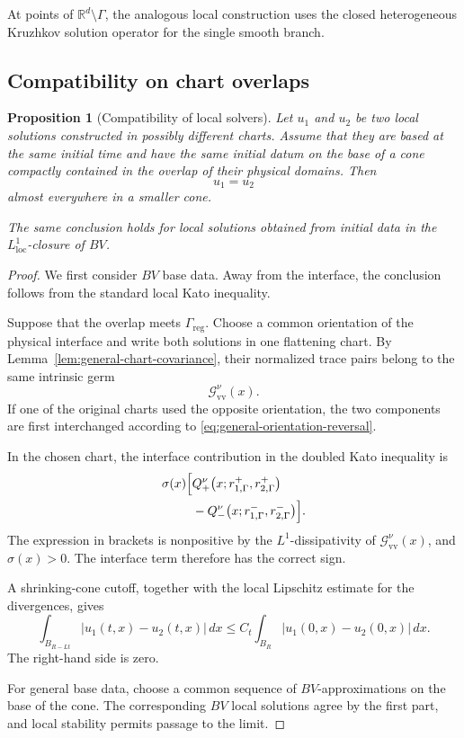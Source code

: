 \documentclass[11pt]{amsart}
\numberwithin{equation}{section}
\theoremstyle{plain}
\newtheorem{proposition}[theorem]{Proposition}
\theoremstyle{definition}
\theoremstyle{remark}
\begin{document}
At points of \(\mathbb R^d\setminus\Gamma\), the analogous local
construction uses the closed heterogeneous Kruzhkov solution operator for the
single smooth branch.

\subsection{Compatibility on chart overlaps}
\label{subsec:general-overlap}

\begin{proposition}[Compatibility of local solvers]
\label{prop:general-overlap-compatibility}
Let \(u_1\) and \(u_2\) be two local solutions constructed in possibly
different charts. Assume that they are based at the same initial time and
have the same initial datum on the base of a cone compactly contained in the
overlap of their physical domains. Then
\[
    u_1=u_2
\]
almost everywhere in a smaller cone.

The same conclusion holds for local solutions obtained from initial data in
the \(L^1_{\mathrm{loc}}\)-closure of \(BV\).
\end{proposition}

\begin{proof}
We first consider \(BV\) base data. Away from the interface, the conclusion
follows from the standard local Kato inequality.

Suppose that the overlap meets \(\Gamma_{\mathrm{reg}}\). Choose a common
orientation of the physical interface and write both solutions in one
flattening chart. By Lemma~\ref{lem:general-chart-covariance}, their
normalized trace pairs belong to the same intrinsic germ
\[
    \mathcal G_{\mathrm{vv}}^\nu(x).
\]
If one of the original charts used the opposite orientation, the two
components are first interchanged according to
\eqref{eq:general-orientation-reversal}.

In the chosen chart, the interface contribution in the doubled Kato
inequality is
\[
\begin{aligned}
\sigma(x)
\Bigl[
&Q_+^\nu
\bigl(
    x;
    r_{1,\Gamma}^+,
    r_{2,\Gamma}^+
\bigr)
\\
&-
Q_-^\nu
\bigl(
    x;
    r_{1,\Gamma}^-,
    r_{2,\Gamma}^-
\bigr)
\Bigr].
\end{aligned}
\]
The expression in brackets is nonpositive by the
\(L^1\)-dissipativity of
\(\mathcal G_{\mathrm{vv}}^\nu(x)\), and \(\sigma(x)>0\).
The interface term therefore has the correct sign.

A shrinking-cone cutoff, together with the local Lipschitz estimate for the
divergences, gives
\[
    \int_{B_{R-Lt}}
        |u_1(t,x)-u_2(t,x)|
    \,dx
    \le
    C_t
    \int_{B_R}
        |u_1(0,x)-u_2(0,x)|
    \,dx.
\]
The right-hand side is zero.

For general base data, choose a common sequence of \(BV\)-approximations on
the base of the cone. The corresponding \(BV\) local solutions agree by the
first part, and local stability permits passage to the limit.
\end{proof}
\end{document}
